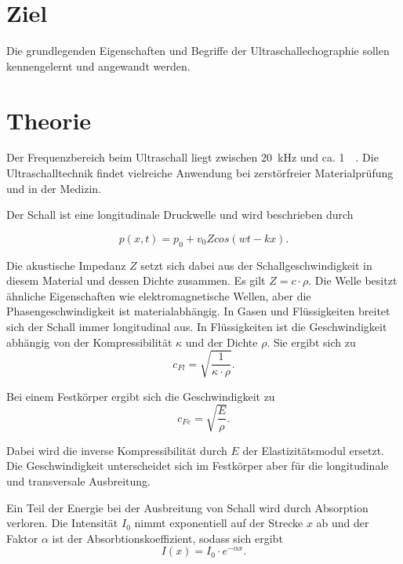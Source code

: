 \section{Ziel}

Die grundlegenden Eigenschaften und Begriffe der Ultraschallechographie sollen kennengelernt und angewandt werden. 

\section{Theorie}
\label{sec:Theorie}

Der Frequenzbereich beim Ultraschall liegt zwischen \SI{20}{\kilo\hertz} und ca. \SI{1}{\giga\Hertz}. Die Ultraschalltechnik findet vielreiche Anwendung bei zerstörfreier Materialprüfung und in der Medizin. 

Der Schall ist eine longitudinale Druckwelle und wird beschrieben durch

\begin{equation}
    p(x,t) = p_0 + v_0 Z cos(wt -kx).
    \label{eqn:welle}
\end{equation}

Die akustische Impedanz $Z$ setzt sich dabei aus der Schallgeschwindigkeit in diesem Material und dessen Dichte zusammen. Es gilt $Z = c \cdot \rho$. 
Die Welle besitzt ähnliche Eigenschaften wie elektromagnetische Wellen, aber die Phasengeschwindigkeit ist materialabhängig. In Gasen und Flüssigkeiten breitet sich der Schall immer longitudinal aus. In Flüssigkeiten ist die Geschwindigkeit abhängig von der Kompressibilität $\kappa$ und der Dichte $\rho$. 
Sie ergibt sich zu 
\begin{equation}
    c_{Fl}= \sqrt{\frac{1}{\kappa \cdot \rho}}.
    \label{eqn:cfl}
\end{equation}

Bei einem Festkörper ergibt sich die Geschwindigkeit zu 
\begin{equation}
    c_{Fe}= \sqrt{\frac{E}{\rho}}.
    \label{eqn:cfe}
\end{equation}

Dabei wird die inverse Kompressibilität durch $E$ der Elastizitätsmodul ersetzt. Die Geschwindigkeit unterscheidet sich im Festkörper aber für die longitudinale und transversale Ausbreitung. 

Ein Teil der Energie bei der Ausbreitung von Schall wird durch Absorption verloren. Die Intensität $I_0$ nimmt exponentiell auf der Strecke $x$ ab und der Faktor $\alpha$ ist der Absorbtionskoeffizient, sodass sich ergibt 
\begin{equation}
    I(x)= I_0 \cdot e^{-\alpha x}.
    \label{eqn:I}
\end{equation}


